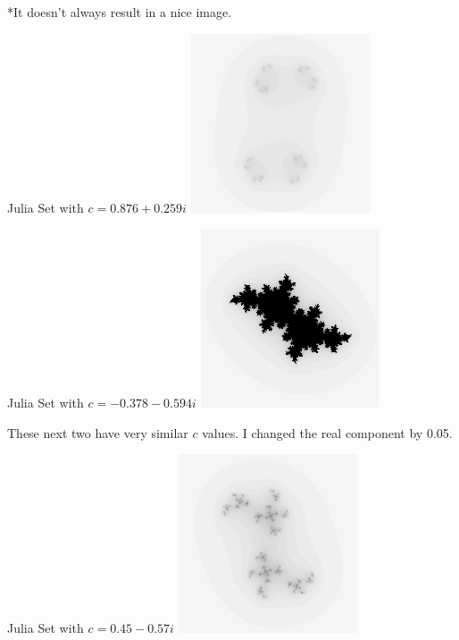 \documentclass{beamer}
\begin{document}
\begin{center}
\begin{frame}
*It doesn't always result in a nice image.
\end{frame}

\begin{frame}
Julia Set with $c = 0.876 + 0.259i$
\includegraphics{Julia5}
\end{frame}

\begin{frame}
Julia Set with $c = -0.378 - 0.594i$
\includegraphics{Julia6}
\end{frame}

\begin{frame}
These next two have very similar $c$ values.  I changed the real component by 0.05.
\end{frame}

\begin{frame}
Julia Set with $c = 0.45 - 0.57i$
\includegraphics{Julia7}
\end{frame}


\end{center}
\end{document}
